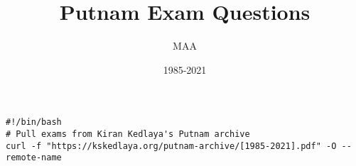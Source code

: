 \documentclass{article}
\title{Putnam Exam Questions}
\author{MAA}
\date{1985-2021}
\begin{document}
\maketitle
\thispagestyle{empty}
\begin{center}
\begin{BVerbatim}
#!/bin/bash
# Pull exams from Kiran Kedlaya's Putnam archive
curl -f "https://kskedlaya.org/putnam-archive/[1985-2021].pdf" -O --remote-name
\end{BVerbatim}
\end{center}

\newpage





















\end{document}
